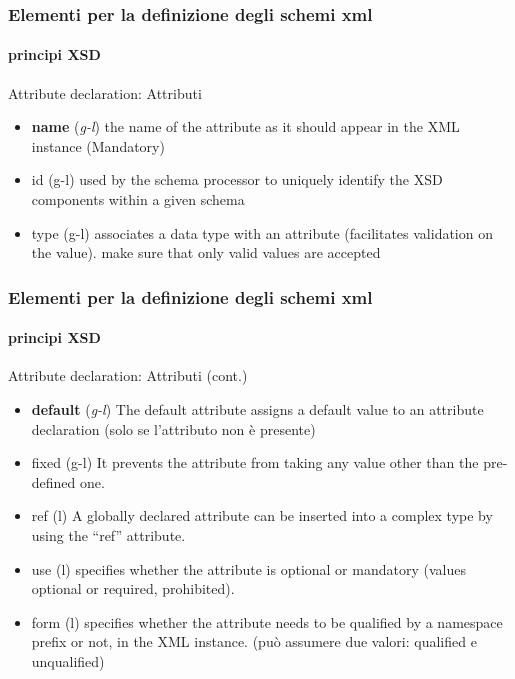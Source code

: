 \begin{frame}
	\frametitle{Elementi per la definizione degli schemi xml}
	\framesubtitle{principi XSD}
	\addtocounter{nframe}{1}

	\begin{block}{Attribute declaration: Attributi}
		\begin{itemize}
			\item \textbf{name} (\textit{g-l}) the name of the attribute as it should appear in the XML instance (Mandatory)
			\item id (g-l) used by the schema processor to uniquely identify the XSD components within a given schema
			\item type (g-l) associates a data type with an attribute (facilitates validation on the value). make sure that only valid values are accepted
		\end{itemize}

	\end{block}

\end{frame}


\begin{frame}
	\frametitle{Elementi per la definizione degli schemi xml}
	\framesubtitle{principi XSD}
	\addtocounter{nframe}{1}

	\begin{block}{Attribute declaration: Attributi (cont.)}
		\begin{itemize}
			\item \textbf{default} (\textit{g-l}) The default attribute assigns a default value to an attribute declaration (solo se l'attributo non è presente)
			\item fixed (g-l) It prevents the attribute from taking any value other than the pre-defined one.
			\item ref (l) A globally declared attribute can be inserted into a complex type by using the ``ref'' attribute.
			\item use (l) specifies whether the attribute is optional or mandatory (values optional or required, prohibited).
			\item form (l) specifies whether the attribute needs to be qualified by a namespace prefix or not, in the XML instance. (può assumere due valori: qualified e unqualified)
		\end{itemize}

	\end{block}


\end{frame}

